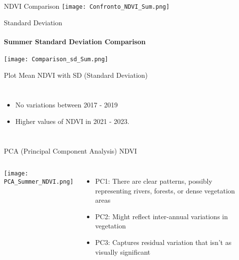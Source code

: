 \documentclass[10pt]{beamer}
\begin{document}
\begin{frame}{NDVI Comparison}
    \centering
    \texttt{[image: Confronto\_NDVI\_Sum.png]}
\end{frame}


\begin{frame}{Standard Deviation}
\framesubtitle{Summer Standard Deviation Comparison}
    \centering
    \texttt{[image: Comparison\_sd\_Sum.png]}
\end{frame}


\begin{frame}{Plot Mean NDVI with SD (Standard Deviation)}
    \begin{columns}
            \begin{itemize}
                \item<1->No variations between 2017 - 2019
                \item<2->Higher values of NDVI in 2021 - 2023.
            \end{itemize}
    \end{columns}
    
\end{frame}


\begin{frame}{PCA (Principal Component Analysis) NDVI}
    \begin{columns}
            \texttt{[image: PCA\_Summer\_NDVI.png]}

            \begin{itemize}
                \item PC1: There are clear patterns, possibly representing rivers, forests, or dense vegetation areas 
                \item PC2: Might reflect inter-annual variations in vegetation
                \item PC3: Captures residual variation that isn’t as visually significant
            \end{itemize}
    \end{columns}
    
\end{frame}
\end{document}
